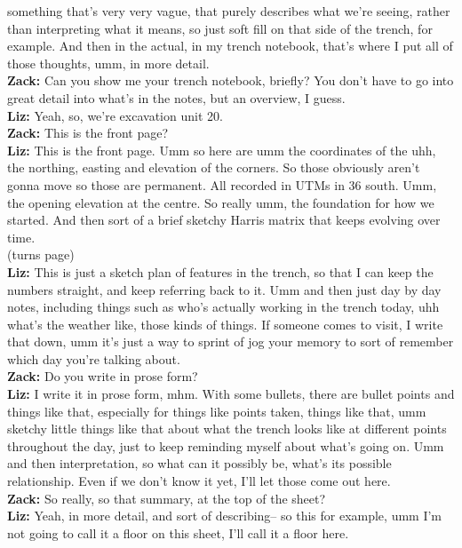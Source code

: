 \documentclass[
]{article}
\begin{document}
something that's very very vague, that purely describes what we're
seeing, rather than interpreting what it means, so just soft fill on
that side of the trench, for example. And then in the actual, in my
trench notebook, that's where I put all of those thoughts, umm, in more
detail.\\
\textbf{Zack:} Can you show me your trench notebook, briefly? You don't
have to go into great detail into what's in the notes, but an overview,
I guess.\\
\textbf{Liz:} Yeah, so, we're excavation unit 20.\\
\textbf{Zack:} This is the front page?\\
\textbf{Liz:} This is the front page. Umm so here are umm the
coordinates of the uhh, the northing, easting and elevation of the
corners. So those obviously aren't gonna move so those are permanent.
All recorded in UTMs in 36 south. Umm, the opening elevation at the
centre. So really umm, the foundation for how we started. And then sort
of a brief sketchy Harris matrix that keeps evolving over time.\\
(turns page)\\
\textbf{Liz:} This is just a sketch plan of features in the trench, so
that I can keep the numbers straight, and keep referring back to it. Umm
and then just day by day notes, including things such as who's actually
working in the trench today, uhh what's the weather like, those kinds of
things. If someone comes to visit, I write that down, umm it's just a
way to sprint of jog your memory to sort of remember which day you're
talking about.\\
\textbf{Zack:} Do you write in prose form?\\
\textbf{Liz:} I write it in prose form, mhm. With some bullets, there
are bullet points and things like that, especially for things like
points taken, things like that, umm sketchy little things like that
about what the trench looks like at different points throughout the day,
just to keep reminding myself about what's going on. Umm and then
interpretation, so what can it possibly be, what's its possible
relationship. Even if we don't know it yet, I'll let those come out
here.\\
\textbf{Zack:} So really, so that summary, at the top of the sheet?\\
\textbf{Liz:} Yeah, in more detail, and sort of describing-- so this for
example, umm I'm not going to call it a floor on this sheet, I'll call
it a floor here.\\
\end{document}
